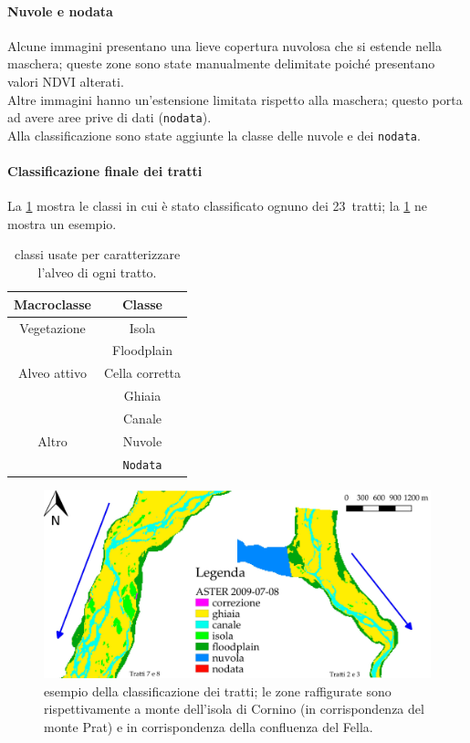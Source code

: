 \paragraph{Nuvole e nodata}
Alcune immagini presentano una lieve copertura nuvolosa che si estende nella maschera; queste zone sono state manualmente delimitate poiché presentano valori NDVI alterati.
\\
Altre immagini hanno un'estensione limitata rispetto alla maschera; questo porta ad avere aree prive di dati (\texttt{nodata}).
\\
Alla classificazione sono state aggiunte la classe delle nuvole e dei \texttt{nodata}.
%
%
\paragraph{Classificazione finale dei tratti}
La \cref{tab:class-tratti} mostra le classi in cui è stato classificato ognuno dei 23~tratti; la \cref{fig:class-is-fl} ne mostra un esempio.
%
\begin{table}
	\centering
	\begin{tabular}{
		c 
		c
		}
		\toprule
		\textbf{Macroclasse}	&	\textbf{Classe}	\\
		\midrule
		Vegetazione		&	Isola	\\
						&	Floodplain	\\
		\midrule
		Alveo attivo	&	Cella corretta	\\
						&	Ghiaia	\\
						&	Canale	\\
		\midrule
		Altro			&	Nuvole	\\
						&	\texttt{Nodata}	\\
		\bottomrule
	\end{tabular}
	\caption[classi utilizzate per caratterizzare l'alveo di ogni tratto]{classi usate per caratterizzare l'alveo di ogni tratto.}
	\label{tab:class-tratti}
\end{table}
%
\begin{figure}
	\centering
	\includegraphics[width=\textwidth]{files/class_is_fl.jpeg}
	\caption[esempio della classificazione dei tratti]{esempio della classificazione dei tratti; le zone raffigurate sono rispettivamente a monte dell'isola di Cornino (in corrispondenza del monte Prat) e in corrispondenza della confluenza del Fella.}
	\label{fig:class-is-fl}
\end{figure}
%
%
%
